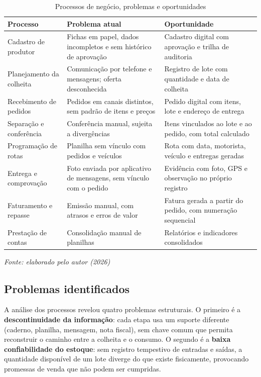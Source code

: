 \begin{table}[H]
  \centering
  \caption{Processos de negócio, problemas e oportunidades}
  \label{tab:processos}
  \fontsize{10}{12}\selectfont
  \begin{tabular}{L{3.2cm}L{5.4cm}L{5.6cm}}
    \toprule
    \textbf{Processo} & \textbf{Problema atual} & \textbf{Oportunidade} \\
    \midrule
    Cadastro de produtor & Fichas em papel, dados incompletos e sem
      histórico de aprovação & Cadastro digital com aprovação e trilha de
      auditoria \\
    Planejamento da colheita & Comunicação por telefone e mensagens; oferta
      desconhecida & Registro de lote com quantidade e data de colheita \\
    Recebimento de pedidos & Pedidos em canais distintos, sem padrão de itens e
      preços & Pedido digital com itens, lote e endereço de entrega \\
    Separação e conferência & Conferência manual, sujeita a divergências &
      Itens vinculados ao lote e ao pedido, com total calculado \\
    Programação de rotas & Planilha sem vínculo com pedidos e veículos &
      Rota com data, motorista, veículo e entregas geradas \\
    Entrega e comprovação & Foto enviada por aplicativo de mensagens, sem
      vínculo com o pedido & Evidência com foto, GPS e observação no próprio
      registro \\
    Faturamento e repasse & Emissão manual, com atrasos e erros de valor &
      Fatura gerada a partir do pedido, com numeração sequencial \\
    Prestação de contas & Consolidação manual de planilhas & Relatórios e
      indicadores consolidados \\
    \bottomrule
  \end{tabular}

  \vspace{2pt}
  {\fontsize{10}{12}\selectfont\itshape Fonte: elaborado pelo autor (2026)}
\end{table}

\subsection{Problemas identificados}

A análise dos processos revelou quatro problemas estruturais. O primeiro é a
\textbf{descontinuidade da informação}: cada etapa usa um suporte diferente
(caderno, planilha, mensagem, nota fiscal), sem chave comum que permita
reconstruir o caminho entre a colheita e o consumo. O segundo é a
\textbf{baixa confiabilidade do estoque}: sem registro tempestivo de entradas e
saídas, a quantidade disponível de um lote diverge do que existe fisicamente,
provocando promessas de venda que não podem ser cumpridas.

